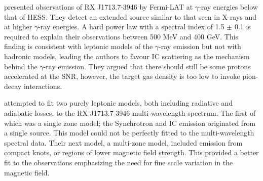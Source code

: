 \documentclass[12pt,a4paper]{article}
\begin{document}
\cite{2011ApJ...734...28A} presented observations of RX J1713.7-3946 by Fermi-LAT at $\gamma$-ray energies below that of HESS. They detect an extended source similar to that seen in X-rays and at higher $\gamma$-ray energies. A hard power law with a spectral index of 1.5 $\pm$ 0.1 is required to explain their observations between 500 MeV and 400 GeV. This finding is consistent with leptonic models of the $\gamma$-ray emission but not with hadronic models, leading the authors to favour IC scattering as the mechanism behind the $\gamma$-ray emission. They argued that there should still be some protons accelerated at the SNR, however, the target gas density is too low to invoke pion-decay interactions.

\cite{2012ApJ...751...65F} attempted to fit two purely leptonic models, both including radiative and adiabatic losses, to the RX J1713.7-3946 multi-wavelength spectrum. The first of which was a single zone model; the Synchrotron and IC emission originated from a single source. This model could not be perfectly fitted to the multi-wavelength spectral data. Their next model, a multi-zone model, included emission from compact knots, or regions of lower magnetic field strength. This provided a better fit to the observations emphasizing the need for fine scale variation in the magnetic field. 
\end{document}
